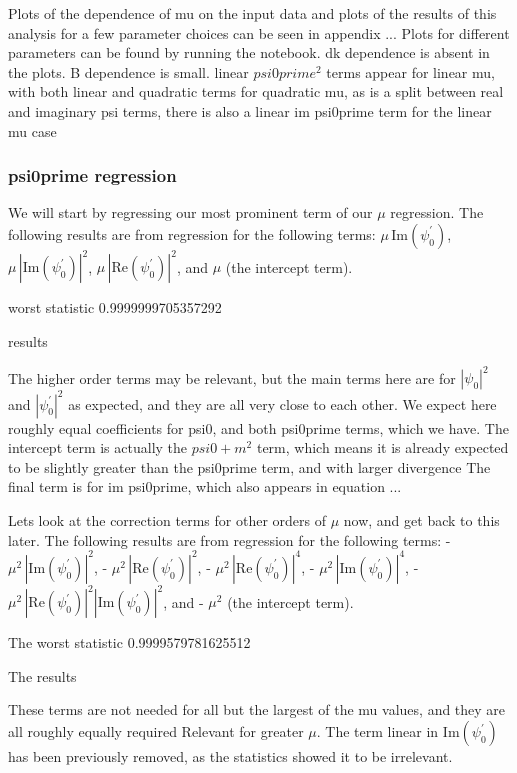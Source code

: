 \documentclass[A4,12pt,oneside]{article}
\renewcommand{\(}{\left(}
\renewcommand{\)}{\right)}
\begin{document}
Plots of the dependence of mu on the input data and plots of the results of this analysis for a few parameter choices can be seen in appendix ... Plots for different parameters can be found by running the notebook. dk dependence is absent in the plots. B dependence is small. linear $psi0prime ^2$ terms appear for linear mu, with both linear and quadratic terms for quadratic mu, as is a split between real and imaginary psi terms, 
there is also a linear im psi0prime term for the linear mu case

\subsubsection{ psi0prime regression}
We will start by regressing our most prominent term of our $\mu$ regression. The following results are from regression for the following terms: $\mu \, \mathrm{Im} (\psi^\prime_0)$, $\mu \, |\mathrm{Im} (\psi^\prime_0)|^2$, $\mu \,|\mathrm{Re} (\psi^\prime_0)|^2$, and $\mu$ (the intercept term).

worst statistic
0.9999999705357292

results 


The higher order terms may be relevant, but the main terms here are for ${\left|\psi_0\right|}^2$ and ${\left|\psi^\prime_0\right|}^2$ as expected, and they are all very close to each other. We expect here roughly equal coefficients for psi0, and both psi0prime terms, which we have. The intercept term is actually the $psi0 + m^2$ term, which means it is already expected to be slightly greater than the psi0prime term, and with larger divergence
The final term is for im psi0prime, which also appears in equation ... 

Lets look at the correction terms for other orders of $\mu$ now, and get back to this later.
The following results are from regression for the following terms: 
 - $\mu^2 \, |\mathrm{Im} (\psi^\prime_0)|^2$, 
 - $\mu^2 \, |\mathrm{Re} (\psi^\prime_0)|^2$, 
 - $\mu^2 \,|\mathrm{Re} (\psi^\prime_0)|^4$,
 - $\mu^2 \, |\mathrm{Im} (\psi^\prime_0)|^4$,
 - $\mu^2 \,|\mathrm{Re} (\psi^\prime_0)|^2|\mathrm{Im} (\psi^\prime_0)|^2$, and
 - $\mu^2$ (the intercept term).
 
The worst statistic
0.9999579781625512

The results 

These terms are not needed for all but the largest of the mu values, and they are all roughly equally required
Relevant for greater $\mu$. The term linear in $\mathrm{Im}(\psi^\prime_0)$ has been previously removed, as the statistics showed it to be irrelevant. 
\end{document}
